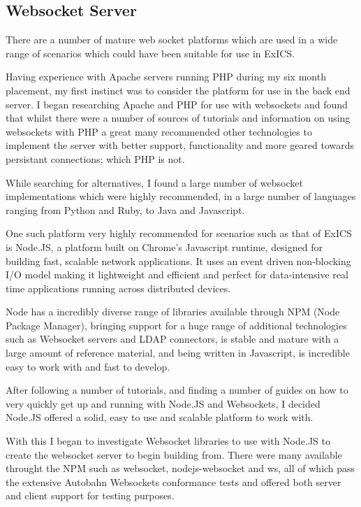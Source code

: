 \subsection{Websocket Server}

There are a number of mature web socket platforms which are used in a wide range of scenarios which could have been suitable for use in ExICS.

Having experience with Apache servers running PHP during my six month placement, my first instinct was to consider the platform for use in the back end server.  I began researching Apache and PHP for use with websockets and found that whilst there were a number of sources of tutorials and information on using websockets with PHP a great many recommended other technologies to implement the server with better support, functionality and more geared towards persistant connections; which PHP is not.

While searching for alternatives, I found a large number of websocket implementations which were highly recommended, in a large number of languages ranging from Python and Ruby, to Java and Javascript.

One such platform very highly recommended for scenarios such as that of ExICS \cite{whyNodeJS} is Node.JS, a platform built on Chrome's Javascript runtime, designed for building fast, scalable network applications.  It uses an event driven non-blocking I/O model making it lightweight and efficient and perfect for data-intensive real time applications running across distributed devices.\cite{nodeJS}

Node has a incredibly diverse range of libraries available through NPM (Node Package Manager), bringing support for a huge range of additional technologies such as Websocket servers and LDAP connectors, is stable and mature with a large amount of reference material, and being written in Javascript, is incredible easy to work with and fast to develop.

After following a number of tutorials, and finding a number of guides on how to very quickly get up and running with Node.JS and Websockets, I decided Node.JS offered a solid, easy to use and scalable platform to work with.

With this I began to investigate Websocket libraries to use with Node.JS to create the websocket server to begin building from.  There were many available throught the NPM such as websocket, nodejs-websocket and ws, all of which pass the extensive Autobahn Websockets conformance tests and offered both server and client support for testing purposes.

